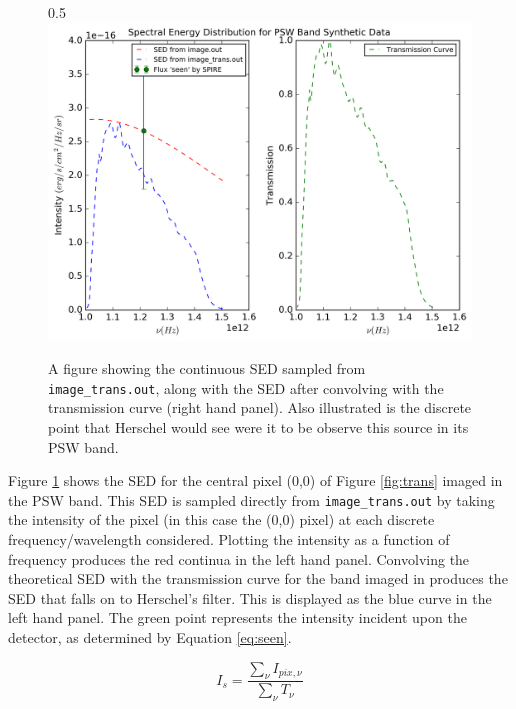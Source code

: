 \documentclass{report}
\begin{document}
\begin{figure}[h]{0.5\textwidth}
  \centering
  \includegraphics[scale=0.5]{../img/spectrum_psw_unweighted_v2}
  \caption[A figure showing the continuous SED sampled from \texttt{image\_trans.out}, along with the SED after convolving with the transmission curve (right hand panel). Also illustrated is the discrete point that Herschel would see were it to be observe this source in its PSW band.]{A figure showing the continuous SED sampled from \texttt{image\_trans.out}, along with the SED after convolving with the transmission curve (right hand panel). Also illustrated is the discrete point that Herschel would see were it to be observe this source in its PSW band.}
  \label{fig:SED_ex}
\end{figure}

Figure \ref{fig:SED_ex} shows the SED for the central pixel (0,0) of Figure \ref{fig:trans} imaged in the PSW band. This SED is sampled directly from \texttt{image\_trans.out} by taking the intensity of the pixel (in this case the (0,0) pixel) at each discrete frequency/wavelength considered. Plotting the intensity as a function of frequency produces the red continua in the left hand panel. Convolving the theoretical SED with the transmission curve for the band imaged in produces the SED that falls on to Herschel's filter. This is displayed as the blue curve in the left hand panel. The green point represents the intensity incident upon the detector, as determined by Equation \ref{eq:seen}.

\begin{equation}
  I_{s} = \frac{\sum_{\nu} I_{pix,\nu}}{\sum_{\nu} T_{\nu}}
  \label{eq:seen}
\end{equation}
\end{document}
